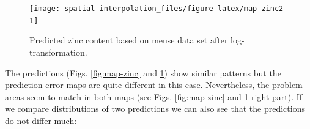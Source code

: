 \documentclass[
  graybox,natbib,nospthms]{svmono}
\begin{document}
\begin{figure}

{\centering \texttt{[image: spatial-interpolation\_files/figure-latex/map-zinc2-1]} 

}

\caption{Predicted zinc content based on meuse data set after log-transformation.}\label{fig:map-zinc2}
\end{figure}

The predictions (Figs. \ref{fig:map-zinc} and \ref{fig:map-zinc2}) show similar
patterns but the prediction error maps are quite different in this case. Nevertheless,
the problem areas seem to match in both maps (see Figs. \ref{fig:map-zinc} and \ref{fig:map-zinc2} right part).
If we compare distributions of two predictions we can also see that the predictions do not differ much:
\end{document}
